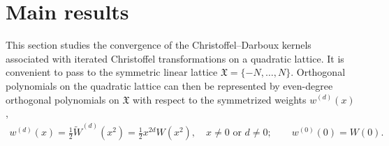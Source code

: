 \documentclass[reqno,11pt]{amsart}
\theoremstyle{plain}
\theoremstyle{definition}
\numberwithin{equation}{section}
\begin{document}
\section{Main results}
\label{sec:outline-method}
This section studies the convergence of the Christoffel--Darboux kernels associated with iterated Christoffel transformations on a quadratic lattice. It is convenient to pass to the symmetric linear lattice $\mathfrak X=\{-N,\ldots,N\}$. Orthogonal polynomials on the quadratic lattice can then be represented by even-degree orthogonal polynomials on $\mathfrak X$ with respect to the symmetrized weights $w^{(d)}(x)$,
\begin{align}
	w^{(d)}(x) = \frac{1}{2}\widetilde{W}^{(d)}(x^2)  = \frac{1}{2}x^{2d}W(x^2),\quad x\neq 0 \text{ or } d\neq 0; \qquad w^{(0)}(0) = W(0).
\end{align}
\end{document}
